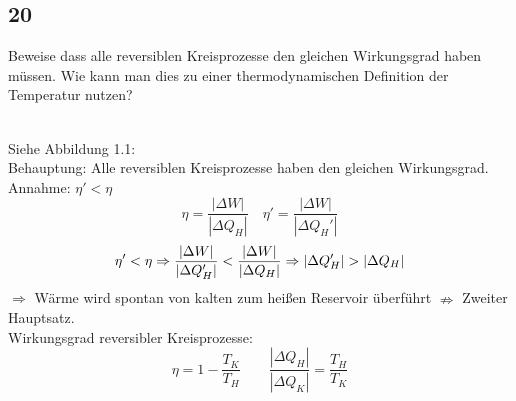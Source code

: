 \subsection{20}
\begin{myfrag}

Beweise dass alle reversiblen Kreisprozesse den gleichen Wirkungsgrad haben
müssen. Wie kann man dies zu einer thermodynamischen Definition der
Temperatur nutzen?
\end{myfrag} \quad \\
Siehe Abbildung 1.1: \\[2ex]
Behauptung: Alle reversiblen Kreisprozesse haben den gleichen Wirkungsgrad.\\[2ex]
Annahme: $\eta' <\eta$ \\[2ex]
$$\eta = \dfrac{|\Delta W|}{|\Delta Q_H |} \quad \eta' = \dfrac{|\Delta W|}{|\Delta Q_H' |}$$ 
$$\eta' < \eta \Rightarrow \dfrac{|\Delta W|}{|\Delta Q_H' |} < \dfrac{|\Delta W|}{|\Delta Q_H |} \\ \Rightarrow | \Delta Q_H'| > | \Delta Q_H | $$
$\Rightarrow $ Wärme wird spontan von kalten zum heißen Reservoir überführt $\nRightarrow$ Zweiter Hauptsatz. \\[2ex]
Wirkungsgrad reversibler Kreisprozesse: \\
$$\eta = 1 - \dfrac{T_K}{T_H} \qquad \dfrac{|\Delta Q_H|}{|\Delta Q_K|} = \dfrac{T_H}{T_K}$$
 
